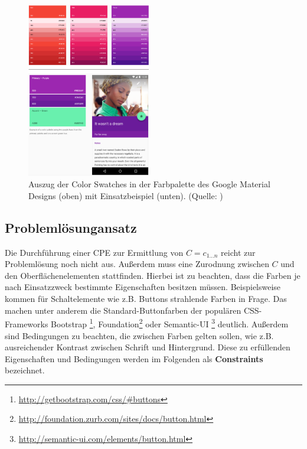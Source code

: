 \documentclass[10pt,a4paper,bibliography=totoc,twocolumn]{scrartcl}
\begin{document}
\begin{figure}
\centering
\includegraphics[width=0.48\textwidth]{img/material_design.png}
\caption{Auszug der Color Swatches in der Farbpalette des Google Material Designs (oben) mit Einsatzbeispiel (unten). (Quelle: \citep{google})}
\label{fig:swatches}
\end{figure}


\subsection{Problemlösungansatz}

Die Durchführung einer CPE zur Ermittlung von $C = c_{1 \ldots n}$ reicht zur Problemlösung noch nicht aus. Außerdem muss eine Zurodnung zwischen $C$ und den Oberflächenelementen stattfinden. Hierbei ist zu beachten, dass die Farben je nach Einsatzzweck bestimmte Eigenschaften besitzen müssen. Beispielsweise kommen für Schaltelemente wie z.B. Buttons strahlende Farben in Frage. Das machen unter anderem die Standard-Buttonfarben der populären CSS-Frameworks Bootstrap \footnote{\url{http://getbootstrap.com/css/\#buttons}}, Foundation\footnote{\url{http://foundation.zurb.com/sites/docs/button.html}} oder Semantic-UI \footnote{\url{http://semantic-ui.com/elements/button.html}} deutlich. Außerdem sind Bedingungen zu beachten, die zwischen Farben gelten sollen, wie z.B. ausreichender Kontrast zwischen Schrift und Hintergrund. Diese zu erfüllenden Eigenschaften und Bedingungen werden im Folgenden als \textbf{Constraints} bezeichnet.
\end{document}

